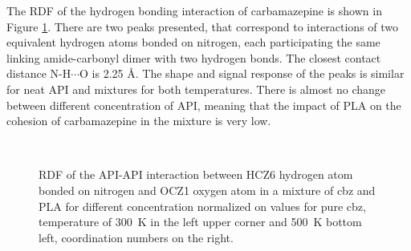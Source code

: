 The RDF of the hydrogen bonding interaction of carbamazepine is shown in Figure \ref{fig:cbz_RDF_}. There are two peaks presented, that correspond to interactions of two equivalent hydrogen atoms bonded on nitrogen, each participating the same linking amide-carbonyl dimer with two hydrogen bonds. The closest contact distance N-H$\cdots$O is 2.25 \AA. The shape and signal response of the peaks is similar for neat API and  mixtures for both temperatures. There is almost no change between different concentration of API, meaning that the impact of PLA on the cohesion of carbamazepine in the mixture is very low. 


\begin{figure}[htb]
	\centering
	\\
	\vspace{-0.3cm}
	\caption{RDF of the API-API interaction between HCZ6 hydrogen atom bonded on nitrogen and OCZ1 oxygen atom in a mixture of cbz and PLA for different concentration normalized on values for pure cbz, temperature of 300~K in the left upper corner and 500~K bottom left, coordination numbers on the right.}
	\label{fig:cbz_RDF_}
\end{figure}

